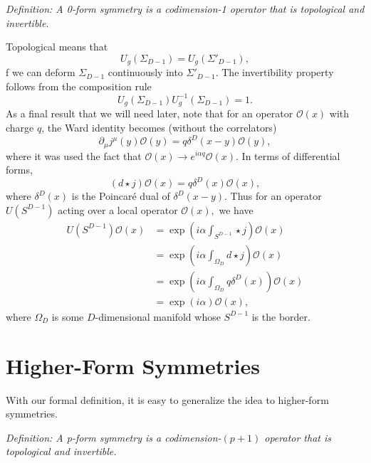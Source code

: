 \documentclass{article}
\begin{document}
\textit{Definition: A 0-form symmetry is a codimension-1 operator that is topological and invertible. }

Topological means that
\begin{equation}
	U_g(\Sigma_{D-1})=U_g(\Sigma'_{D-1}),
\end{equation}
f we can deform $\Sigma_{D-1}$ continuously into $\Sigma'_{D-1}.$  The invertibility property follows from the composition rule 
\begin{equation}
	U_g(\Sigma_{D-1})U^{-1}_g(\Sigma_{D-1})=1.
\end{equation}
As a final result that we will need later, note that for an operator $\mathcal{O}(x) $ with charge $q$, the Ward identity becomes (without the correlators) 
\begin{equation}
	\partial_\mu j^\mu(y)\mathcal{O}(y)=q\delta^{D}(x-y)\mathcal{O}(y),
\end{equation}
where it was used the fact that $\mathcal{O}(x)\to e^{i\alpha q}\mathcal{O}(x)$. In terms of differential forms, 
\begin{equation}
	(d\star j)\mathcal{O}(x)=q\delta^{D}(x)\mathcal{O}(x),
\end{equation}
where $\delta^D(x)$ is the Poincaré dual of $\delta^D(x-y)$. Thus for an operator $U(S^{D-1})$ acting over a local operator $\mathcal{O}(x), $ we have 
\begin{equation}
 \begin{split}
 	U(S^{D-1})\mathcal{O}(x)&=\exp\left(i\alpha\int_{S^{D-1}}\star j\right)\mathcal{O}(x)\\&=\exp\left(i\alpha\int_{\Omega_D}d\star j\right)\mathcal{O}(x)\\&=\exp\left(i\alpha\int_{\Omega_D}q\delta^D(x)\right)\mathcal O(x)\\&=\exp(i\alpha)\mathcal{O}(x),
 \end{split}
\end{equation}
where $\Omega_D$ is some $D$-dimensional manifold whose $S^{D-1}$ is the border.  
\section{Higher-Form Symmetries}
With our formal definition, it is easy to generalize the idea to higher-form symmetries. 

\textit{Definition: A p-form symmetry is a codimension-$(p+1)$ operator that is topological and invertible. }
\end{document}
